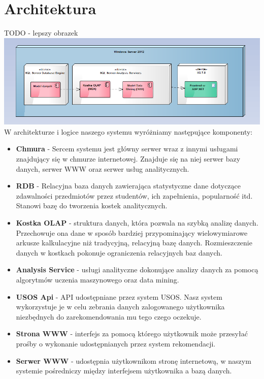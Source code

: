 \documentclass[licencjacka]{pracamgr}
\begin{document}
 \chapter{Architektura}
TODO - lepszy obrazek \newline
 \includegraphics[scale=0.6]{Architektura.png}\newline
 W architekturze i logice naszego systemu wyróżniamy następujące komponenty:
 \begin{itemize}
 
\item \textbf{Chmura} - Sercem systemu jest główny serwer wraz z innymi usługami znajdujący się w chmurze internetowej. Znajduje się na niej serwer bazy danych, serwer WWW oraz serwer usług analitycznych.

\item \textbf {RDB} - Relacyjna baza danych zawierająca statystyczne dane dotyczące zdawalności przedmiotów przez studentów, ich zapełnienia, popularność itd. Stanowi bazę do tworzenia kostek analitycznych. 

\item \textbf {Kostka OLAP} - struktura danych, która pozwala na szybką analizę danych. Przechowuje ona dane w sposób bardziej przypominający wielowymiarowe arkusze kalkulacyjne niż tradycyjną, relacyjną bazę danych. Rozmieszczenie danych w kostkach pokonuje ograniczenia relacyjnych baz danych.

\item \textbf{Analysis Service} - usługi analityczne dokonujące analizy danych za pomocą algorytmów uczenia maszynowego oraz data mining.
 
\item \textbf{USOS Api} - API udostępniane przez system USOS. Nasz system wykorzystuje je w celu zebrania danych zalogowanego użytkownika niezbędnych do zarekomendowania mu tego czego oczekuje.

\item \textbf{Strona WWW} - interfejs za pomocą którego użytkownik może przesyłać prośby o wykonanie udostępnianych przez system rekomendacji.

\item \textbf{Serwer WWW} - udostępnia użytkownikom stronę internetową, w naszym systemie pośredniczy między interfejsem użytkownika a bazą danych.
  
\end{itemize}
\end{document}
